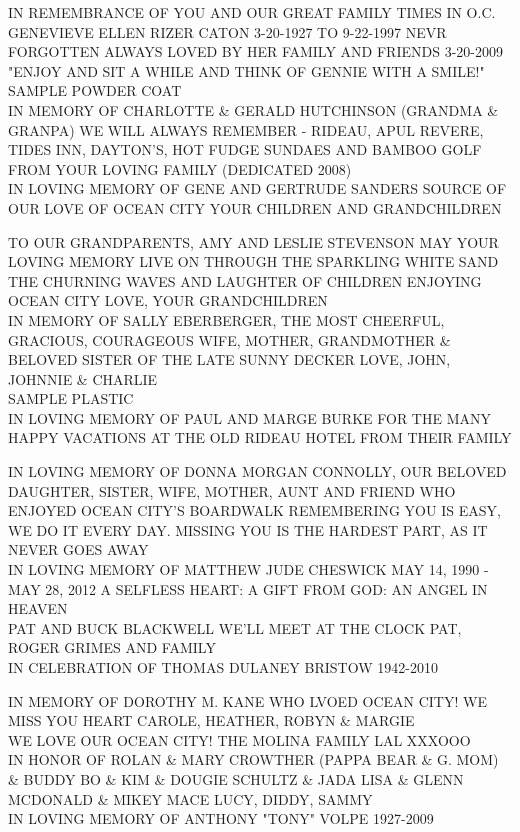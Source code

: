 \documentclass[10pt,letterpaper]{article}
\begin{document}
IN REMEMBRANCE OF YOU AND OUR GREAT FAMILY TIMES IN O.C. GENEVIEVE ELLEN RIZER CATON 3{-}20{-}1927 TO 9{-}22{-}1997 NEVR FORGOTTEN ALWAYS LOVED BY HER FAMILY AND FRIENDS 3{-}20{-}2009 "ENJOY AND SIT A WHILE AND THINK OF GENNIE WITH A SMILE!"\\
SAMPLE POWDER COAT\\
IN MEMORY OF CHARLOTTE \& GERALD HUTCHINSON (GRANDMA \& GRANPA) WE WILL ALWAYS REMEMBER {-} RIDEAU, APUL REVERE, TIDES INN, DAYTON'S, HOT FUDGE SUNDAES AND BAMBOO GOLF FROM YOUR LOVING FAMILY (DEDICATED 2008)\\
IN LOVING MEMORY OF GENE AND GERTRUDE SANDERS SOURCE OF OUR LOVE OF OCEAN CITY YOUR CHILDREN AND GRANDCHILDREN

TO OUR GRANDPARENTS, AMY AND LESLIE STEVENSON MAY YOUR LOVING MEMORY LIVE ON THROUGH THE SPARKLING WHITE SAND THE CHURNING WAVES AND LAUGHTER OF CHILDREN ENJOYING OCEAN CITY LOVE, YOUR GRANDCHILDREN\\
IN MEMORY OF SALLY EBERBERGER, THE MOST CHEERFUL, GRACIOUS, COURAGEOUS WIFE, MOTHER, GRANDMOTHER \& BELOVED SISTER OF THE LATE SUNNY DECKER LOVE, JOHN, JOHNNIE \& CHARLIE\\
SAMPLE PLASTIC\\
IN LOVING MEMORY OF PAUL AND MARGE BURKE FOR THE MANY HAPPY VACATIONS AT THE OLD RIDEAU HOTEL FROM THEIR FAMILY

IN LOVING MEMORY OF DONNA MORGAN CONNOLLY, OUR BELOVED DAUGHTER, SISTER, WIFE, MOTHER, AUNT AND FRIEND WHO ENJOYED OCEAN CITY'S BOARDWALK REMEMBERING YOU IS EASY, WE DO IT EVERY DAY.  MISSING YOU IS THE HARDEST PART, AS IT NEVER GOES AWAY\\
IN LOVING MEMORY OF MATTHEW JUDE CHESWICK MAY 14, 1990 {-} MAY 28, 2012 A SELFLESS HEART: A GIFT FROM GOD: AN ANGEL IN HEAVEN\\
PAT AND BUCK BLACKWELL WE'LL MEET AT THE CLOCK PAT, ROGER GRIMES AND FAMILY\\
IN CELEBRATION OF THOMAS DULANEY BRISTOW 1942{-}2010

IN MEMORY OF DOROTHY M. KANE WHO LVOED OCEAN CITY!  WE MISS YOU HEART CAROLE, HEATHER, ROBYN \& MARGIE\\
WE LOVE OUR OCEAN CITY! THE MOLINA FAMILY LAL XXXOOO\\
IN HONOR OF ROLAN \& MARY CROWTHER (PAPPA BEAR \& G. MOM) \& BUDDY BO \& KIM \& DOUGIE SCHULTZ \& JADA LISA \& GLENN MCDONALD \& MIKEY MACE LUCY, DIDDY, SAMMY\\
IN LOVING MEMORY OF ANTHONY "TONY" VOLPE 1927{-}2009
\end{document}

